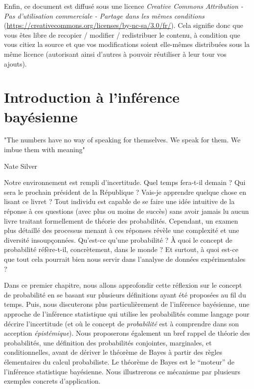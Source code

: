 \documentclass[
  a4paper,11pt,twoside,onecolumn,openright,final,oldfontcommands]{memoir}
\theoremstyle{definition}
\theoremstyle{definition}
\theoremstyle{definition}
\theoremstyle{remark}
\begin{document}
Enfin, ce document est diffusé sous une licence \emph{Creative Commons Attribution - Pas d'utilisation commerciale - Partage dans les mêmes conditions} (\url{https://creativecommons.org/licenses/by-nc-sa/3.0/fr/}). Cela signifie donc que vous êtes libre de recopier / modifier / redistribuer le contenu, à condition que vous citiez la source et que vos modifications soient elle-mêmes distribuées sous la même licence (autorisant ainsi d'autres à pouvoir réutiliser à leur tour vos ajouts).

\hypertarget{introduction}{%
\chapter{Introduction à l'inférence bayésienne}\label{introduction}}


\epigraph{"The numbers have no way of speaking for themselves. We speak for them. We imbue them with meaning"}{Nate Silver}

Notre environnement est rempli d'incertitude. Quel temps fera-t-il demain ? Qui sera le prochain président de la République ? Vais-je apprendre quelque chose en lisant ce livret ? Tout individu est capable de se faire une idée intuitive de la réponse à ces questions (avec plus ou moins de succès) sans avoir jamais lu aucun livre traitant formellement de théorie des probabilités. Cependant, un examen plus détaillé des processus menant à ces réponses révèle une complexité et une diversité insoupçonnées. Qu'est-ce qu'une probabilité ? À quoi le concept de probabilité réfère-t-il, concrètement, dans le monde ? Et surtout, à quoi est-ce que tout cela pourrait bien nous servir dans l'analyse de données expérimentales ?

Dans ce premier chapitre, nous allons approfondir cette réflexion sur le concept de probabilité en se basant sur plusieurs définitions ayant été proposées au fil du temps. Puis, nous discuterons plus particulièrement de l'inférence bayésienne, une approche de l'inférence statistique qui utilise les probabilités comme langage pour décrire l'incertitude (et où le concept de \emph{probabilité} est à comprendre dans son acception \emph{épistémique}). Nous proposerons également un bref rappel de théorie des probabilités, une définition des probabilités conjointes, marginales, et conditionnelles, avant de dériver le théorème de Bayes à partir des règles élementaires du calcul probabiliste. Le théorème de Bayes est le ``moteur'' de l'inférence statistique bayésienne. Nous illustrerons ce mécanisme par plusieurs exemples concrets d'application.
\end{document}
